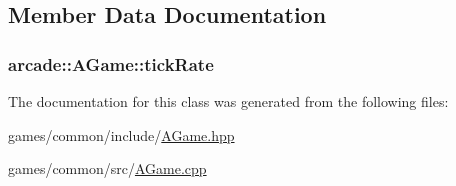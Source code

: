 \subsection{Member Data Documentation}
\hypertarget{classarcade_1_1_a_game_a9ff7ad14ba3172ebd9db335ad9d92fb2}{
\subsubsection[{tick\-Rate}]{ arcade\-::\-A\-Game\-::tick\-Rate\hspace{0.3cm}{\ttfamily [protected]}}}\label{classarcade_1_1_a_game_a9ff7ad14ba3172ebd9db335ad9d92fb2}


The documentation for this class was generated from the following files\-:\begin{DoxyCompactItemize}
\item 
games/common/include/\hyperlink{_a_game_8hpp}{A\-Game.\-hpp}\item 
games/common/src/\hyperlink{_a_game_8cpp}{A\-Game.\-cpp}\end{DoxyCompactItemize}
